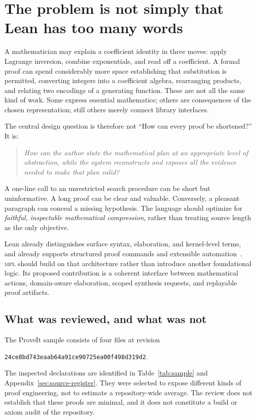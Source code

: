\documentclass[11pt,a4paper]{article}
\newcommand{\MPL}{\textnormal{\textsc{mpl}}}
\theoremstyle{remark}
\begin{document}
\section{The problem is not simply that Lean has too many words}

A mathematician may explain a coefficient identity in three moves: apply Lagrange inversion, combine exponentials, and read off a coefficient. A formal proof can spend considerably more space establishing that substitution is permitted, converting integers into a coefficient algebra, rearranging products, and relating two encodings of a generating function. These are not all the same kind of work. Some express essential mathematics; others are consequences of the chosen representation; still others merely connect library interfaces.

The central design question is therefore not ``How can every proof be shortened?'' It is:
\begin{quote}
\emph{How can the author state the mathematical plan at an appropriate level of abstraction, while the system reconstructs and exposes all the evidence needed to make that plan valid?}
\end{quote}
A one-line call to an unrestricted search procedure can be short but uninformative. A long proof can be clear and valuable. Conversely, a pleasant paragraph can conceal a missing hypothesis. The language should optimize for \emph{faithful, inspectable mathematical compression}, rather than treating source length as the only objective.

Lean already distinguishes surface syntax, elaboration, and kernel-level terms, and already supports structured proof commands and extensible automation~\cite{lean-elaboration}. \MPL{} should build on that architecture rather than introduce another foundational logic. Its proposed contribution is a coherent interface between mathematical actions, domain-aware elaboration, scoped synthesis requests, and replayable proof artifacts.

\subsection{What was reviewed, and what was not}

The ProveIt sample consists of four files at revision
\begin{center}\small\texttt{24ce8bd743eaab64a91ce90725ea00f498d319d2}.\end{center}
The inspected declarations are identified in Table~\ref{tab:sample} and Appendix~\ref{sec:source-register}. They were selected to expose different kinds of proof engineering, not to estimate a repository-wide average. The review does not establish that these proofs are minimal, and it does not constitute a build or axiom audit of the repository.
\end{document}
